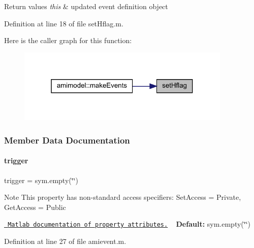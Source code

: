 \begin{DoxyRetVals}{Return values}
{\em this} & updated event definition object \\
\hline
\end{DoxyRetVals}


Definition at line 18 of file set\+Hflag.\+m.

Here is the caller graph for this function\+:
\nopagebreak
\begin{figure}[H]
\begin{center}
\leavevmode
\includegraphics[width=289pt]{classamievent_aef1933f186f69e58e2aa1b00d01f75e7_icgraph}
\end{center}
\end{figure}


\subsubsection{Member Data Documentation}
\mbox{\label{classamievent_ae194cb817eae4085f8023885100c68dd}} 
\paragraph{\texorpdfstring{trigger}{trigger}}
{\footnotesize\ttfamily trigger = sym.\+empty(\char`\"{}\char`\"{})}

\begin{DoxyNote}{Note}
This property has non-\/standard access specifiers\+: {\ttfamily Set\+Access = Private, Get\+Access = Public} 

\href{http://www.mathworks.com/help/matlab/matlab_oop/property-attributes.html}{\texttt{ Matlab documentation of property attributes.}} ~\newline
{\bfseries{Default\+:}} sym.\+empty(\char`\"{}\char`\"{}) 
\end{DoxyNote}


Definition at line 27 of file amievent.\+m.

\mbox{\label{classamievent_ab9227561ac246ee4b70f9e65c25ffda7}} 
